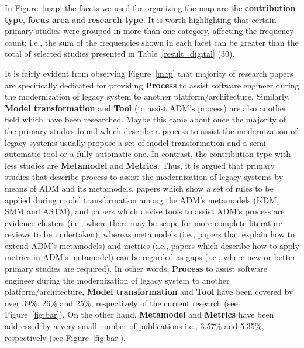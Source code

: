 In Figure~\ref{map} the facets we used for organizing the map are the \textbf{contribution type}, \textbf{focus area} and \textbf{research type}. It is worth highlighting that certain primary studies were grouped in more than one category, affecting the frequency count; i.e., the sum of the frequencies shown in each facet can be greater than the total of selected studies presented in Table~\ref{result_digital} (30).

 It is fairly evident from observing Figure~\ref{map} that majority of research papers are specifically dedicated for providing \textbf{Process} to assist software engineer during the modernization of legacy system to another platform/architecture. Similarly, \textbf{Model transformation} and \textbf{Tool} (to assist ADM's process) are also another field which have been researched. Maybe this came about once the majority of the primary studies found which describe a process to assist the modernization of legacy systems usually propose a set of model transformation and a semi-automatic tool or a fully-automatic one. In contrast, the contribution type with less studies are \textbf{Metamodel} and \textbf{Metrics}. Thus, it is argued that primary studies that describe process to assist the modernization of legacy systems by means of ADM and its metamodels, papers which show a set of rules to be applied during model transformation among the ADM's metamodels (KDM, SMM and ASTM), and papers which devise tools to assist ADM's process are evidence clusters (i.e., where there may be scope for more complete literature reviews to be undertaken), whereas metamodels (i.e., papers that explain how to extend ADM's metamodels) and metrics (i.e., papers which describe how to apply metrics in ADM's metamodel) can be regarded as gaps (i.e., where new or better primary studies are required). In other words, \textbf{Process} to assist software engineer during the modernization of legacy system to another platform/architecture, \textbf{Model transformation} and \textbf{Tool} have been covered by over 39\%, 26\% and 25\%, respectively of the current research (see Figure~\ref{fig:bar}). On the other hand, \textbf{Metamodel} and \textbf{Metrics} have been addressed by a very small number of publications i.e., 3.57\% and 5.35\%, respectively (see Figure~\ref{fig:bar}).   %


